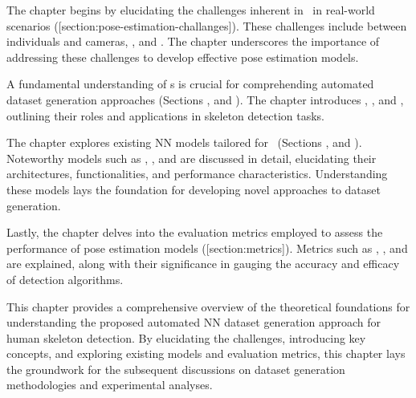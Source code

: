 
The chapter begins by elucidating the challenges inherent in \HPE\ in real-world scenarios ([section:pose-estimation-challanges]). These challenges include  between individuals and cameras, , and . The chap\-ter underscores the importance of addressing these challenges to develop effective pose estimation models.


A fundamental understanding of \NN\-s is crucial for comprehending automated dataset generation approaches (Sections \in[section:nn],  and ). The chapter introduces , , and , outlining their roles and applications in skeleton detection tasks.


The chapter explores existing NN models tailored for \HPE\ (Sections ,  and ). Noteworthy models such as , , and  are discussed in detail, elucidating their architectures, functionalities, and performance characteristics. Understanding these models lays the foundation for developing novel approaches to dataset generation.


Lastly, the chapter delves into the evaluation metrics employed to assess the performance of pose estimation models ([section:metrics]). Metrics such as , , and  are explained, along with their significance in gauging the accuracy and efficacy of detection algorithms.

This chapter provides a comprehensive overview of the theoretical foundations for understanding the proposed automated NN dataset generation ap\-proach for human skeleton detection. By elucidating the challenges, introducing key concepts, and exploring existing models and evaluation metrics, this chapter lays the groundwork for the subsequent discussions on dataset generation methodologies and experimental analyses.